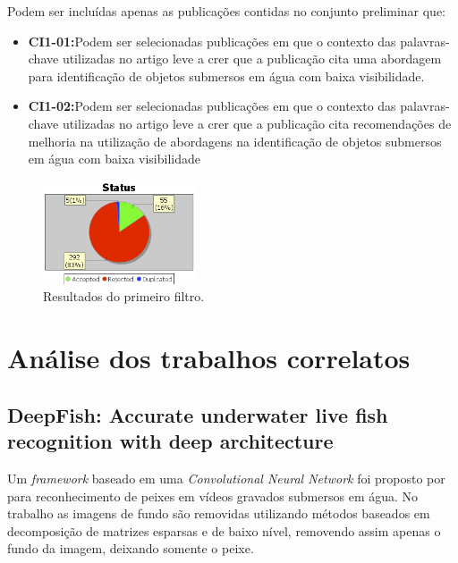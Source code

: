 Podem ser incluídas apenas as publicações contidas no conjunto preliminar que:
\begin{itemize}
	\item \textbf{CI1-01:}Podem ser selecionadas publicações em que o contexto das palavras-chave utilizadas no artigo leve a crer que a publicação cita uma abordagem para identificação de objetos submersos em água com baixa visibilidade.
	\item \textbf{CI1-02:}Podem ser selecionadas publicações em que o contexto das palavras-chave utilizadas no artigo leve a crer que a publicação cita recomendações de melhoria na utilização de abordagens na identificação de objetos submersos em água com baixa visibilidade
\end{itemize}


\begin{figure}[h]
	\caption{\label{fig:stascorr} Resultados do primeiro filtro.}
	\begin{center}
	    \includegraphics[width=0.4\textwidth]{resources/analisecorre}
	\end{center}
\end{figure}



\section{Análise dos trabalhos correlatos}

\subsection{DeepFish: Accurate underwater live fish recognition with deep architecture}
Um \textit{framework} baseado em uma \textit{Convolutional Neural Network} foi proposto por  para reconhecimento de peixes em vídeos gravados submersos em água. No trabalho as imagens de fundo são removidas utilizando métodos baseados em decomposição de matrizes esparsas e de baixo nível, removendo assim apenas o fundo da imagem, deixando somente o peixe.

